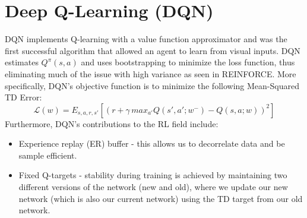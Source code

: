 \documentclass[11pt]{article} %
\begin{document}
\section{Deep Q-Learning (DQN)}
DQN \cite{dqn} implements Q-learning with a value function approximator and was the first successful algorithm that allowed an agent to learn from visual inputs. DQN estimates $Q^{\pi}(s,a)$ and uses bootstrapping to minimize the loss function, thus eliminating much of the issue with high variance as seen in REINFORCE. More specifically, DQN's objective function is to minimize the following Mean-Squared TD Error: 
\begin{equation*}
    \mathcal{L}(w) = E_{s, a, r, s'}[(r + \gamma\,max_{a'}Q(s', a'; w^-) - Q(s, a; w))^2]
\end{equation*}
Furthermore, DQN's contributions to the RL field include:
\begin{itemize}
    \item Experience replay (ER) buffer - this allows us to decorrelate data and be sample efficient.  
    \item Fixed Q-targets - stability during training is achieved by maintaining two different versions of the network (new and old), where we update our new network (which is also our current network) using the TD target from our old network. 
\end{itemize}
\end{document}
